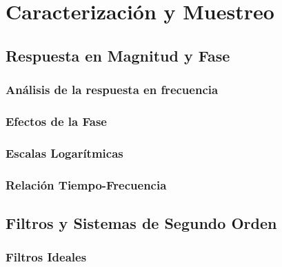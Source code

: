 \documentclass[11pt,a4paper,openany]{book}
\begin{document}

\part{Caracterización y Muestreo}


\chapter{Respuesta en Magnitud y Fase}

\section{Análisis de la respuesta en frecuencia}

\section{Efectos de la Fase}

\section{Escalas Logarítmicas}

\section{Relación Tiempo-Frecuencia}


\chapter{Filtros y Sistemas de Segundo Orden}

\section{Filtros Ideales}
\end{document}
